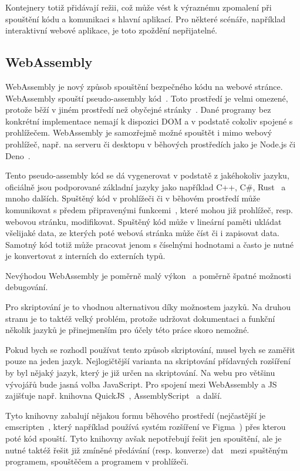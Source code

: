 Kontejnery totiž přidávají režii, což může vést k výraznému zpomalení při spouštění kódu a komunikaci s hlavní aplikací. 
Pro některé scénáře, například interaktivní webové aplikace, je toto zpoždění nepřijatelné.

\subsection{WebAssembly}\label{text:webassembly}

WebAssembly je nový způsob spouštění bezpečného kódu na webové stránce.
WebAssembly spouští pseudo-assembly kód~\cite{webassembly}.
Toto prostředí je velmi omezené, protože běží v jiném prostředí než obyčejné stránky~\cite{webassembly, figma_plugins_blog}.
Dané programy bez konkrétní implementace nemají k dispozici DOM a v podstatě cokoliv spojené s prohlížečem.
WebAssembly je samozřejmě možné spouštět i mimo webový prohlížeč, např. na serveru či desktopu v běhových prostředích jako je Node.js či Deno~\cite{webassembly}.

Tento pseudo-assembly kód se dá vygenerovat v podstatě z jakéhokoliv jazyku, oficiálně jsou podporované základní jazyky jako například C++, C\#, Rust~\cite{webassembly} a mnoho dalších.
Spuštěný kód v prohlížeči či v běhovém prostředí může komunikovat s předem připravenými funkcemi~\cite{webassembly}, které mohou již prohlížeč, resp. webovou stránku, modifikovat.
Spuštěný kód může v lineární paměti ukládat všelijaké data, ze kterých poté webová stránka může číst či i zapisovat data.
Samotný kód totiž může pracovat jenom s číselnými hodnotami a často je nutné je konvertovat z interních do externích typů.

Nevýhodou WebAssembly je poměrně malý výkon~\cite{webassembly, figma_plugins_blog} a poměrně špatné možnosti debugování.

Pro skriptování je to vhodnou alternativou díky možnostem jazyků. 
Na druhou stranu je to taktéž velký problém, protože udržovat dokumentaci a funkční několik jazyků je přinejmenším pro účely této práce skoro nemožné.

Pokud bych se rozhodl používat tento způsob skriptování, musel bych se zaměřit pouze na jeden jazyk.
Nejlogičtější varianta na skriptování přídavných rozšíření by byl nějaký jazyk, který je již určen na skriptování.
Na webu pro většinu vývojářů bude jasná volba JavaScript.
Pro spojení mezi WebAssembly a JS zajišťuje např. knihovna QuickJS~\cite{quickjs}, AssemblyScript~\cite{assemblyscript} a další.

Tyto knihovny zabalují nějakou formu běhového prostředí (nejčastější je emscripten~\cite{assemblyscript, quickjs, figma_plugins_blog}, který například používá systém rozšíření ve Figma~\cite{figma_plugins_blog}) přes kterou poté kód spouští.
Tyto knihovny avšak nepotřebují řešit jen spouštění, ale je nutné taktéž řešit již zmíněné předávání (resp. konverze) dat~\cite{assemblyscript} mezi spuštěným programem, spouštěčem a programem v prohlížeči.

